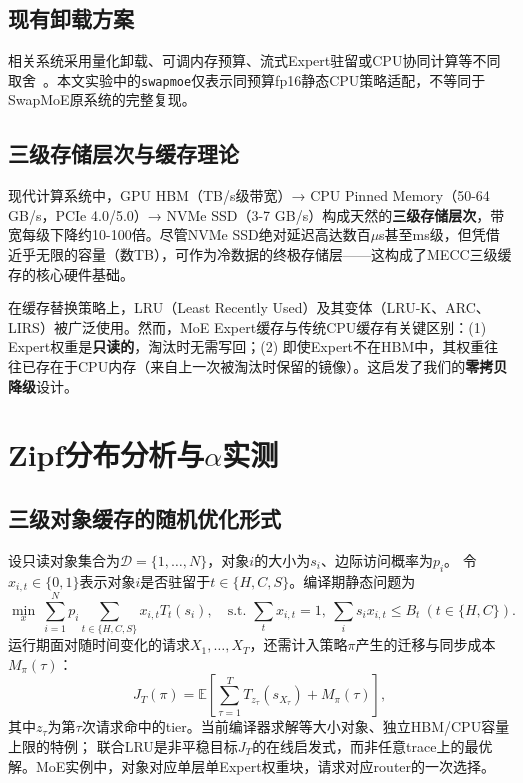 \documentclass[11pt,a4paper]{article}
\begin{document}
\subsection{现有卸载方案}

相关系统采用量化卸载、可调内存预算、流式Expert驻留或CPU协同计算等不同取舍~\cite{mixtral_offloading,swapmoe2024,fluxmoe2026,fiddler}。本文实验中的\texttt{swapmoe}仅表示同预算fp16静态CPU策略适配，不等同于SwapMoE原系统的完整复现。

\subsection{三级存储层次与缓存理论}

现代计算系统中，GPU HBM（TB/s级带宽）→ CPU Pinned Memory（50-64 GB/s，PCIe 4.0/5.0）→ NVMe SSD（3-7 GB/s）构成天然的\textbf{三级存储层次}，带宽每级下降约10-100倍。尽管NVMe SSD绝对延迟高达数百$\mu$s甚至ms级，但凭借近乎无限的容量（数TB），可作为冷数据的终极存储层——这构成了MECC三级缓存的核心硬件基础。

在缓存替换策略上，LRU（Least Recently Used）及其变体（LRU-K、ARC、LIRS）被广泛使用。然而，MoE Expert缓存与传统CPU缓存有关键区别：(1) Expert权重是\textbf{只读的}，淘汰时无需写回；(2) 即使Expert不在HBM中，其权重往往已存在于CPU内存（来自上一次被淘汰时保留的镜像）。这启发了我们的\textbf{零拷贝降级}设计。

\section{Zipf分布分析与$\alpha$实测}

\subsection{三级对象缓存的随机优化形式}

设只读对象集合为$\mathcal D=\{1,\ldots,N\}$，对象$i$的大小为$s_i$、边际访问概率为$p_i$。
令$x_{i,t}\in\{0,1\}$表示对象$i$是否驻留于$t\in\{H,C,S\}$。编译期静态问题为
\begin{equation}
\min_x\ \sum_{i=1}^{N}p_i\sum_{t\in\{H,C,S\}}x_{i,t}T_t(s_i),
\quad
\text{s.t. }\sum_t x_{i,t}=1,\ \sum_i s_i x_{i,t}\le B_t\ (t\in\{H,C\}).
\end{equation}
运行期面对随时间变化的请求$X_1,\ldots,X_T$，还需计入策略$\pi$产生的迁移与同步成本$M_\pi(\tau)$：
\begin{equation}
J_T(\pi)=\mathbb E\left[\sum_{\tau=1}^{T}
T_{z_\tau}(s_{X_\tau})+M_\pi(\tau)\right],
\end{equation}
其中$z_\tau$为第$\tau$次请求命中的tier。当前编译器求解等大小对象、独立HBM/CPU容量上限的特例；
联合LRU是非平稳目标$J_T$的在线启发式，而非任意trace上的最优解。MoE实例中，对象对应单层单Expert权重块，请求对应router的一次选择。
\end{document}
